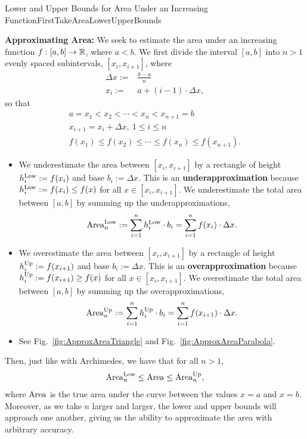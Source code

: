 \begin{methodColor}{Lower and Upper Bounds for Area Under an Increasing Function}{FirstTakeAreaLowerUpperBounds}

\textbf{Approximating Area:} We seek to estimate the area under an increasing function $f:[a, b] \to \mathbb R$, where $a < b$. We first divide the interval $[a, b]$ into $n >1$ evenly spaced subintervals, $[x_i, x_{i+1}]$, where
\begin{equation}
    \begin{aligned}
        \Delta x :=& \frac{b-a}{n} \\
           x_i :=& a + (i-1) \cdot \Delta x,
    \end{aligned}
\end{equation}
so that 
    \begin{gather}
        a = x_1 < x_2 < \cdots < x_{n} < x_{n+1} = b\\
        x_{i+1} = x_i + \Delta x, ~1 \le i \le n \\
          f(x_1) \le f(x_2)  \le \cdots \le f(x_{n}) \le  f(x_{n+1}). 
    \end{gather}
    \begin{itemize}
        \item We underestimate the area between $[x_i, x_{i+1}]$ by a rectangle of height $h_i^{\rm Low}:=f(x_i)$ and base $b_i:= \Delta x$. This is an \textbf{underapproximation} because $h_i^{\rm Low}:=f(x_i) \le f(x)$ for all $x \in [x_i, x_{i+1}]$. We underestimate the  total area between $[a, b]$ by summing up the underapproximations,
        \begin{equation}
            {\rm Area}^{\rm Low}_n : = \sum_{i=1}^n h_i^{\rm Low} \cdot b_i =  \sum_{i=1}^n f(x_i)\cdot \Delta x.
        \end{equation}
        \item We overestimate the area between $[x_i, x_{i+1}]$ by a rectangle of height $h_i^{\rm Up}:=f(x_{i+1})$ and base $b_i:= \Delta x$. This is an \textbf{overapproximation} because $ h_i^{\rm Up}:=f(x_{i+1}) \ge f(x)$ for all $x \in [x_i, x_{i+1}]$.  We overestimate the  total area between $[a, b]$ by summing up the overapproximations,
        \begin{equation}
            {\rm Area}^{\rm Up}_n : = \sum_{i=1}^n h_i^{\rm Up} \cdot b_i =  \sum_{i=1}^n f(x_{i+1})\cdot \Delta x.
        \end{equation}
        \item See Fig.~\ref{fig:ApproxAreaTriangle} and Fig.~\ref{fig:ApproxAreaParabola}.
    \end{itemize} 

  Then, just like with Archimedes, we have that for all $n > 1$, 
    $${\rm Area}^{\rm Low}_n \le {\rm Area} \le  {\rm Area}^{\rm Up}_n,   $$
    where ${\rm Area}$ is the true area under the curve between the values $x=a$ and $x=b$. Moreover, as we take $n$ larger and larger, the lower and upper bounds will approach one another, giving us the ability to approximate the area with arbitrary accuracy.
\end{methodColor}

